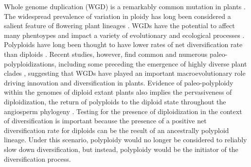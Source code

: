 Whole genome duplication (WGD) is a remarkably common mutation in plants \citep{husband_2013, zenilferguson_2017}.
The widespread prevalence of variation in ploidy has long been considered a salient feature of flowering plant lineages \citep{stebbins1938}. 
WGDs have the potential to affect many phentoypes and impact a variety of evolutionary \citep{ramsey_2002} and ecological processes \citep{sessa_2019}.
Polyploids have long been thought to have lower rates of net diversification rate than diploids \citep{mayrose_2011, mayrose_2015}. 
Recent studies, however, find common and numerous paleo-polyploidizations, including some preceding the emergence of highly diverse plant clades \citep{soltis_2014, landis_2018}, suggesting that WGDs have played an important macroevolutionary role driving innovation and diversification in plants.
Evidence of paleo-polyploidy within the genomes of diploid extant plants also implies the pervasiveness of diploidization, the return of polyploids to the diploid state throughout the angiosperm phylogeny \citep{soltis_2015diploidization, dodsworth_2015}.
Testing for the presence of diploidization in the context of diversification is important because the presence of a positive net diversification rate for diploids can be the result of an ancestrally polyploid lineage.
Under this scenario, polyploidy would no longer be considered to reliably slow down diversification, but instead, polyploidy would be the initiator of the diversification process. %

